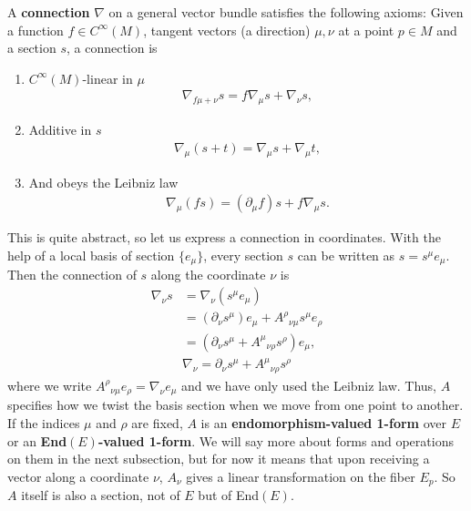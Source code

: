 \documentclass[aps,nofootinbib]{revtex4}
\begin{document}
A {\bf connection} $\nabla$ on a general vector bundle satisfies the following axioms: Given a function $f \in C^{\infty} (M)$, tangent vectors (a direction) $\mu,\nu$ at a point $p \in M$ and a section $s$, a connection is
\begin{enumerate}
\item $C^{\infty} (M)$-linear in $\mu$
\begin{align}
\nabla_{f\mu + \nu} s = f \nabla_{\mu} s + \nabla_{\nu} s,
\end{align}
\item Additive in $s$
\begin{align}
\nabla_{\mu} (s+t) = \nabla_{\mu} s + \nabla_{\mu} t,
\end{align}
\item And obeys the Leibniz law
\begin{align}
\nabla_{\mu} (fs) = (\partial_{\mu} f) s + f \nabla_{\mu} s. 
\end{align}
\end{enumerate}
This is quite abstract, so let us express a connection in coordinates. With the help of a local basis of section $\{e_{\mu}\}$, every section $s$ can be written as $s = s^{\mu} e_{\mu}$. Then the connection of $s$ along the coordinate $\nu$ is 
\begin{align*}
\nabla_{\nu} s &= \nabla_{\nu} (s^{\mu} e_{\mu}) \\
	&= (\partial_{\nu} s^{\mu}) e_{\mu} + A^{\rho}{}_{\nu \mu} s^{\mu} e_{\rho} \\
    &= (\partial_{\nu} s^{\mu} + A^{\mu}{}_{\nu \rho} s^{\rho})e_{\mu},
\end{align*}
\begin{align}
\boxed{ \nabla_{\nu} = \partial_{\nu} s^{\mu} + A^{\mu}{}_{\nu \rho} s^{\rho}}
\end{align}
where we write $A^{\rho}{}_{\nu \mu} e_{\rho} = \nabla_{\nu} e_{\mu}$ and we have only used the Leibniz law. Thus, $A$ specifies how we twist the basis section when we move from one point to another.
If the indices $\mu$ and $\rho$ are fixed, $A$ is an {\bf endomorphism-valued 1-form} over $E$ or an {\bf End$(E)$-valued 1-form}. We will say more about forms and operations on them in the next subsection, but for now it means that upon receiving a vector along a coordinate $\nu$, $A_{\nu}$ gives a linear transformation on the fiber $E_p$. So $A$ itself is also a section, not of $E$ but of End$(E)$.
\end{document}
